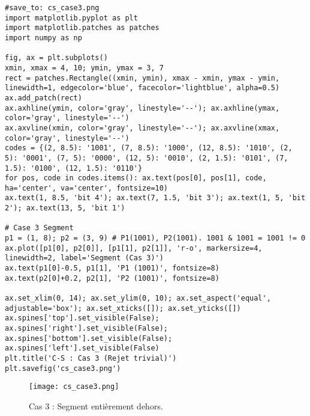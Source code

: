 \documentclass{article}
\begin{document}
\begin{verbatim}
#save_to: cs_case3.png
import matplotlib.pyplot as plt
import matplotlib.patches as patches
import numpy as np

fig, ax = plt.subplots()
xmin, xmax = 4, 10; ymin, ymax = 3, 7
rect = patches.Rectangle((xmin, ymin), xmax - xmin, ymax - ymin, linewidth=1, edgecolor='blue', facecolor='lightblue', alpha=0.5)
ax.add_patch(rect)
ax.axhline(ymin, color='gray', linestyle='--'); ax.axhline(ymax, color='gray', linestyle='--')
ax.axvline(xmin, color='gray', linestyle='--'); ax.axvline(xmax, color='gray', linestyle='--')
codes = {(2, 8.5): '1001', (7, 8.5): '1000', (12, 8.5): '1010', (2, 5): '0001', (7, 5): '0000', (12, 5): '0010', (2, 1.5): '0101', (7, 1.5): '0100', (12, 1.5): '0110'}
for pos, code in codes.items(): ax.text(pos[0], pos[1], code, ha='center', va='center', fontsize=10)
ax.text(1, 8.5, 'bit 4'); ax.text(7, 1.5, 'bit 3'); ax.text(1, 5, 'bit 2'); ax.text(13, 5, 'bit 1')

# Case 3 Segment
p1 = (1, 8); p2 = (3, 9) # P1(1001), P2(1001). 1001 & 1001 = 1001 != 0
ax.plot([p1[0], p2[0]], [p1[1], p2[1]], 'r-o', markersize=4, linewidth=2, label='Segment (Cas 3)')
ax.text(p1[0]-0.5, p1[1], 'P1 (1001)', fontsize=8)
ax.text(p2[0]+0.2, p2[1], 'P2 (1001)', fontsize=8)

ax.set_xlim(0, 14); ax.set_ylim(0, 10); ax.set_aspect('equal', adjustable='box'); ax.set_xticks([]); ax.set_yticks([])
ax.spines['top'].set_visible(False); ax.spines['right'].set_visible(False); ax.spines['bottom'].set_visible(False); ax.spines['left'].set_visible(False)
plt.title('C-S : Cas 3 (Rejet trivial)')
plt.savefig('cs_case3.png')
\end{verbatim}
\begin{figure}[H] \centering \texttt{[image: cs\_case3.png]} \caption{Cas 3 : Segment entièrement dehors.} \label{fig:cs_case3} \end{figure}
\end{document}
